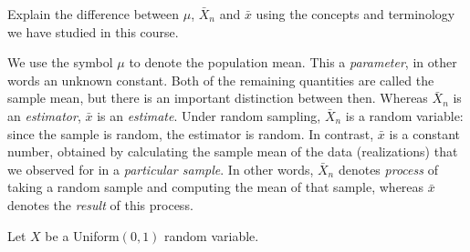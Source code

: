 \documentclass[addpoints,12pt]{exam}
\newcommand{\expect}{\mathbb{E}}
\begin{document}
\begin{questions}
\question[15] Explain the difference between $\mu$, $\bar{X}_n$ and $\bar{x}$ using the concepts and terminology we have studied in this course. 
	\begin{solution}[3in]
		We use the symbol $\mu$ to denote the population mean. This a \emph{parameter}, in other words an unknown constant. Both of the remaining quantities are called the sample mean, but there is an important distinction between then. Whereas $\bar{X}_n$ is an \emph{estimator}, $\bar{x}$ is an \emph{estimate}. Under random sampling, $\bar{X}_n$ is a random variable: since the sample is random, the estimator is random. In contrast, $\bar{x}$ is a constant number, obtained by calculating the sample mean of the data (realizations) that we observed for in a \emph{particular sample}. In other words, $\bar{X}_n$ denotes \emph{process} of taking a random sample and computing the mean of that sample, whereas $\bar{x}$ denotes the \emph{result} of this process.
	\end{solution}

\question Let $X$ be a Uniform$(0,1)$ random variable.
\end{questions}
\end{document}
